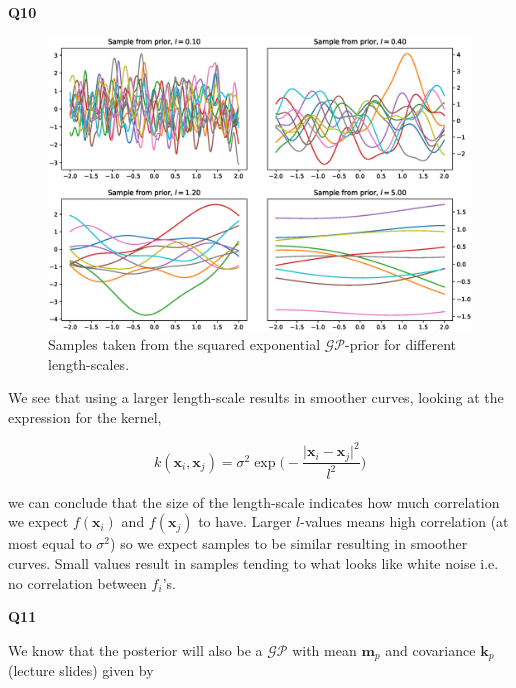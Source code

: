 \documentclass[a4paper]{article}
\begin{document}
\noindent\textbf{Q10}

\noindent\makebox[\linewidth]{\rule{\textwidth}{0.4pt}}

\begin{figure}[H]
	\centering
	\includegraphics[width=1\textwidth]{GPprior.eps}
	\caption{\label{fig:frog} Samples taken from the squared exponential $\mathcal{GP}$-prior for different length-scales.}
\end{figure}

\noindent We see that using a larger length-scale results in smoother curves, looking at the expression for the kernel,

\begin{equation*}
k(\mathbf{x}_i,\mathbf{x}_j)=\sigma^2\exp\bigg(-\frac{\vert \mathbf{x}_i-\mathbf{x}_j\vert^2}{l^2}\bigg)
\end{equation*} 

\noindent we can conclude that the size of the length-scale indicates how much correlation we expect $f(\mathbf{x}_i)$ and $f(\mathbf{x}_j)$ to have. Larger $l$-values means high correlation (at most equal to $\sigma^2$) so we expect samples to be similar resulting in smoother curves. Small values result in samples tending to what looks like white noise i.e. no correlation between $f_i$'s.

\newpage

\noindent\textbf{Q11}

\noindent\makebox[\linewidth]{\rule{\textwidth}{0.4pt}}
\hfil

\noindent We know that the posterior will also be a $\mathcal{GP}$ with mean $\mathbf{m}_p$ and covariance $\mathbf{k}_p$ (lecture slides) given by
\end{document}
